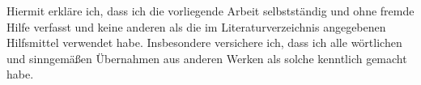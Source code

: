 Hiermit erkläre ich, dass ich die vorliegende Arbeit selbstständig und ohne fremde Hilfe verfasst und keine anderen als die im Literaturverzeichnis angegebenen Hilfsmittel verwendet habe. Insbesondere versichere ich, dass ich alle wörtlichen und sinngemäßen Übernahmen aus anderen Werken als solche kenntlich gemacht habe. 